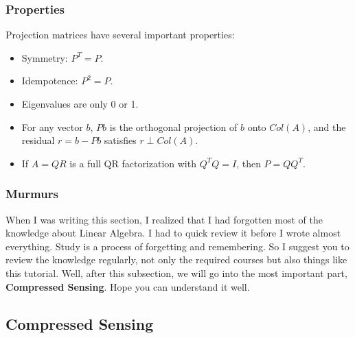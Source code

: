 \documentclass[12pt]{ctexart}
\begin{document}
\subsubsection{\textbf{Properties}}

Projection matrices have several important properties:

\begin{itemize}
  \item Symmetry: $P^T = P$.
  \item Idempotence: $P^2 = P$.
  \item Eigenvalues are only 0 or 1.
  \item For any vector $b$, $Pb$ is the orthogonal projection of $b$ onto $Col(A)$, and the residual $r = b - Pb$ satisfies $r \perp Col(A)$.
  \item If $A = Q R$ is a full QR factorization with $Q^T Q = I$, then $P = Q Q^T$.
\end{itemize}

\subsubsection{\textbf{Murmurs}}

When I was writing this section, I realized that I had forgotten most of the knowledge about
Linear Algebra. I had to quick review it before I wrote almost everything. Study is a
process of forgetting and remembering. So I suggest you to review the knowledge
regularly, not only the required courses but also things like this tutorial. Well, after this
subsection, we will go into the most important part, \textbf{Compressed Sensing}. Hope you
can understand it well.

\newpage
\thispagestyle{empty}
\begin{center}
    \vspace*{96pt}
    \fontsize{60}{60}\par
    \fontsize{26}{31.2}\section{\textbf{Compressed Sensing}}\par %
    \vspace{25pt}
    \fontsize{18}{21.6}\par %
    \vfill
\end{center}
\end{document}
